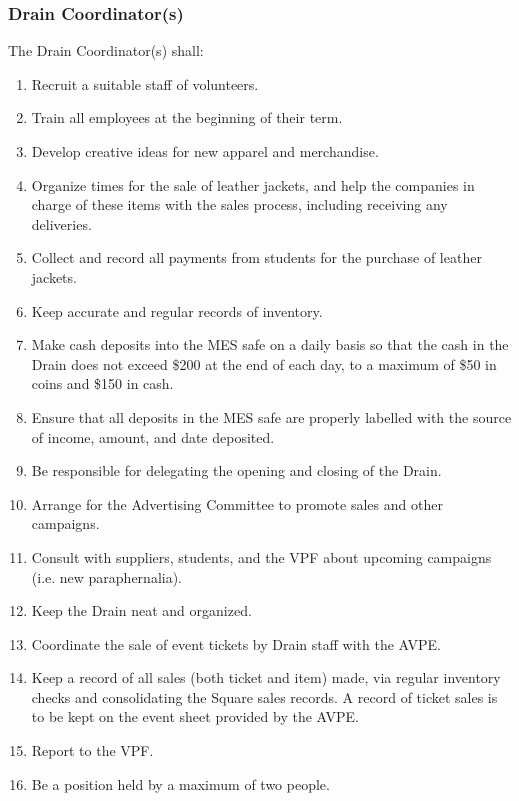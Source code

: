 \subsubsection{Drain Coordinator(s)}
\label{drain-coordinators}

The Drain Coordinator(s) shall:

\begin{enumerate}
 \item
  Recruit a suitable staff of volunteers.
 \item
  Train all employees at the beginning of their term.
 \item
  Develop creative ideas for new apparel and merchandise.
 \item
  Organize times for the sale of leather jackets, and help the companies
  in charge of these items with the sales process, including receiving
  any deliveries.
 \item
  Collect and record all payments from students for the purchase of
  leather jackets.
 \item
  Keep accurate and regular records of inventory.
 \item
  Make cash deposits into the MES safe on a daily basis so that the cash
  in the Drain does not exceed \$200 at the end of each day, to a
  maximum of \$50 in coins and \$150 in cash.
 \item
  Ensure that all deposits in the MES safe are properly labelled with
  the source of income, amount, and date deposited.
 \item
  Be responsible for delegating the opening and closing of the Drain.
 \item
  Arrange for the Advertising Committee to promote sales and other
  campaigns.
 \item
  Consult with suppliers, students, and the VPF about upcoming campaigns
  (i.e. new paraphernalia).
 \item
  Keep the Drain neat and organized.
 \item
  Coordinate the sale of event tickets by Drain staff with the AVPE.
 \item
  Keep a record of all sales (both ticket and item) made, via regular
  inventory checks and consolidating the Square sales records. A record
  of ticket sales is to be kept on the event sheet provided by the AVPE.
 \item
  Report to the VPF.
 \item
  Be a position held by a maximum of two people.
\end{enumerate}

